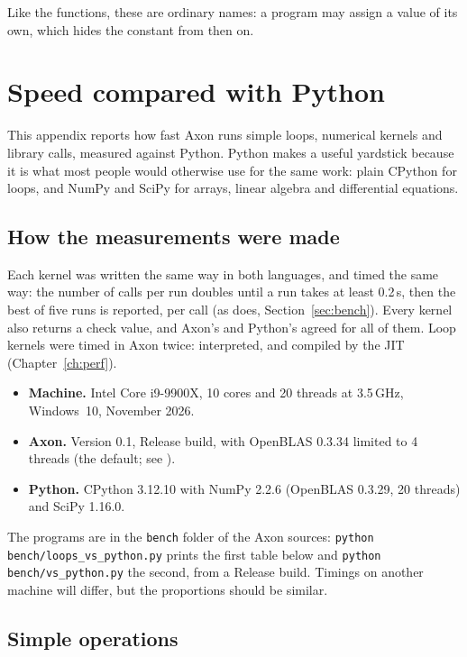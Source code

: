 \documentclass[11pt,a4paper,openany]{report}
\begin{document}
{{Like the functions, these are ordinary names: a program may assign  a
value of its own, which hides the constant from then on.

\chapter{Speed compared with Python}\label{app:speed}

This appendix reports how fast Axon runs simple loops, numerical kernels and
library calls, measured against Python. Python makes a useful yardstick
because it is what most people would otherwise use for the same work:
plain CPython for loops, and NumPy and SciPy for arrays, linear algebra and
differential equations.

\section*{How the measurements were made}

Each kernel was written the same way in both languages, and timed the same
way: the number of calls per run doubles until a run takes at least 0.2\,s,
then the best of five runs is reported, per call (as  does,
Section~\ref{sec:bench}). Every kernel also returns a check value, and Axon's
and Python's agreed for all of them. Loop kernels were timed in Axon twice:
interpreted, and compiled by the JIT (Chapter~\ref{ch:perf}).

\begin{itemize}
\item \textbf{Machine.} Intel Core i9-9900X, 10 cores and 20 threads at
  3.5\,GHz, Windows~10, November 2026.
\item \textbf{Axon.} Version 0.1, Release build, with OpenBLAS 0.3.34 limited
  to 4 threads (the default; see ).
\item \textbf{Python.} CPython 3.12.10 with NumPy 2.2.6 (OpenBLAS 0.3.29, 20
  threads) and SciPy 1.16.0.
\end{itemize}

The programs are in the \texttt{bench} folder of the Axon sources:
\texttt{python bench/loops\_vs\_python.py} prints the first table below and
\texttt{python bench/vs\_python.py} the second, from a Release build. Timings
on another machine will differ, but the proportions should be similar.

\section*{Simple operations}

}}
\end{document}
